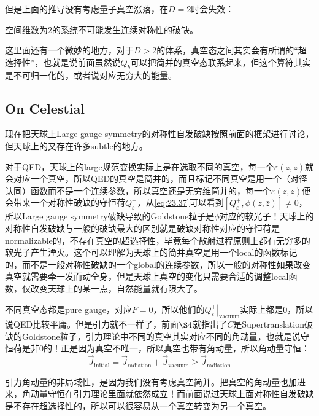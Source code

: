 但是上面的推导没有考虑量子真空涨落，在$D=2$时会失效：
\begin{theorem}
	空间维数为2的系统不可能发生连续对称性的破缺。
\end{theorem}
这里面还有一个微妙的地方，对于$D>2$的体系，真空态之间其实会有所谓的“超选择性”，也就是说前面虽然说$Q_b$可以把简并的真空态联系起来，但这个算符其实是不可归一化的，或者说对应无穷大的能量。
\subsection{On Celestial}
现在把天球上Large gauge symmetry的对称性自发破缺按照前面的框架进行讨论，但天球上的又存在许多subtle的地方。

对于QED，天球上的large规范变换实际上是在选取不同的真空，每一个$\varepsilon(z,\bar z)$就会对应一个真空，所以QED的真空是简并的，而且标记不同真空是用一个（对径认同）函数而不是一个连续参数，所以真空还是无穷维简并的，每一个$\varepsilon(z,\bar z)$便会带来一个对称性破缺的守恒荷$Q^+_\varepsilon$，从\ref{eq:23.37}可以看到$\left[Q_{\varepsilon}^{+},\phi(z,\bar{z})\right]\neq 0$，所以Large gauge symmetry破缺导致的Goldstone粒子是$\phi$对应的软光子！天球上的对称性自发破缺与一般的破缺最大的区别就是破缺对称性对应的守恒荷是normalizable的，不存在真空的超选择性，毕竟每个散射过程原则上都有无穷多的软光子产生湮灭。这个可以理解为天球上的简并真空是用一个local的函数标记的，而不是一般对称性破缺的一个global的连续参数，所以一般的对称性如果改变真空就需要牵一发而动全身，但是天球上真空的变化只需要合适的调整local函数，仅改变天球上的某一点，自然能量就有限大了。

不同真空态都是pure gauge，对应$F=0$，所以他们的$\left.Q^+_\varepsilon\right|_{\mathrm{vacuum}}$实际上都是0，所以说QED比较平庸。但是引力就不一样了，前面$\S 4$就指出了$C$是Supertranslation破缺的Goldstone粒子，引力理论中不同的真空其实对应不同的角动量，也就是说守恒荷是非0的！正是因为真空不唯一，所以真空也带有角动量，所以角动量守恒：
\begin{equation}
	\vec J_{\mathrm{initial}}=\vec J_{\mathrm{radiation}}+\vec J_{\mathrm{vacuum}}\geq \vec{J}_{\mathrm{radiation}}
\end{equation}

引力角动量的非局域性，是因为我们没有考虑真空简并。把真空的角动量也加进来，角动量守恒在引力理论里面就依然成立！而前面说过天球上面对称性自发破缺是不存在超选择性的，所以可以很容易从一个真空转变为另一个真空。
